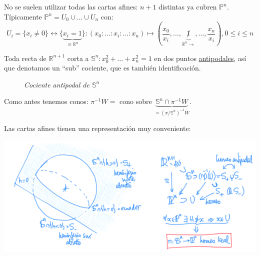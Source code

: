\begin{defi}
No se suelen utilizar todas las cartas afines: $n + 1$ distintas ya cubren $\mathbb{P}^{n}$. Típicamente $\mathbb{P}^{n} = U_0 \cup \ldots \cup U_n$ con:
\[
    U_i = \{x_i \neq 0\} \leftrightarrow \{\underbrace{x_i = 1}_{\equiv \mathbb{R}^n}\}: \left( x_0 : \ldots : x_i : \ldots : x_n \right) \mapsto \left( \frac{x_0}{x_i}, \ldots, \underbrace{\not1}_{\mathbb{R}^n \rightarrow}, \ldots, \frac{x_n}{x_i} \right), 0 \le i \le n
\]
\end{defi}

\begin{prop}
    Toda recta de $\mathbb{R}^{n + 1}$ corta a $\mathbb{S}^{n}: x_0^2 + \ldots + x_n^2 = 1$ en dos puntos \underline{antipodales}, así que denotamos un ``sub'' cociente, que es también identificación.
    \begin{figure}[H]
        \centering
        \caption{\textit{Cociente antipodal de $\mathbb{S}^n$}}
        \label{fig:cociente_antipodal_Sn}
    \end{figure}
\end{prop}
\begin{demo} 
    Como antes tenemos conos: $\pi^{-1}W = $ cono sobre $\underbrace{\mathbb{S}^n \cap \pi^{-1}W}_{= \left( \pi / \mathbb{S}^n \right)^{-1} W}$.
\end{demo}
\begin{obs}
    Las cartas afines tienen una representación muy conveniente:
    \begin{center}
        \includegraphics[scale=0.3]{images/repr_carta_afin} 
    \end{center}
\end{obs}

